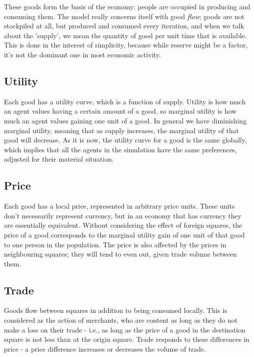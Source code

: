 \documentclass[12pt]{article}
\begin{document}
		These goods form the basis of the economy: people are occupied in producing and consuming them.
		The model really concerns itself with good \textit{flow}; goods are not stockpiled at all, but produced and consumed every iteration, and when we talk about the 'supply', we mean the quantity of good per unit time that is available.
		This is done in the interest of simplicity, because while reserve might be a factor, it's not the dominant one in most economic activity.
		
		\subsection{Utility}
		Each good has a utility curve, which is a function of supply.
		Utility is how much an agent values having a certain amount of a good, so marginal utility is how much an agent values gaining one unit of a good.
		In general we have diminishing marginal utility, meaning that as supply increases, the marginal utility of that good will decrease.
		As it is now, the utility curve for a good is the same globally, which implies that all the agents in the simulation have the same preferences, adjusted for their material situation.
		

		\subsection{Price}
		Each good has a local price, represented in arbitrary price units.
		These units don't necessarily represent currency, but in an economy that has currency they are essentially equivalent.
		Without considering the effect of foreign squares, the price of a good corresponds to the marginal utility gain of one unit of that good to one person in the population. 
		The price is also affected by the prices in neighbouring squares; they will tend to even out, given trade volume between them.
		
		\subsection{Trade}
		Goods flow between squares in addition to being consumed locally.
		This is considered as the action of merchants, who are content as long as they do not make a loss on their trade - i.e., as long as the price of a good in the destination square is not less than at the origin square.
		Trade responds to these differences in price - a price difference increases or decreases the volume of trade.
		
\end{document}
